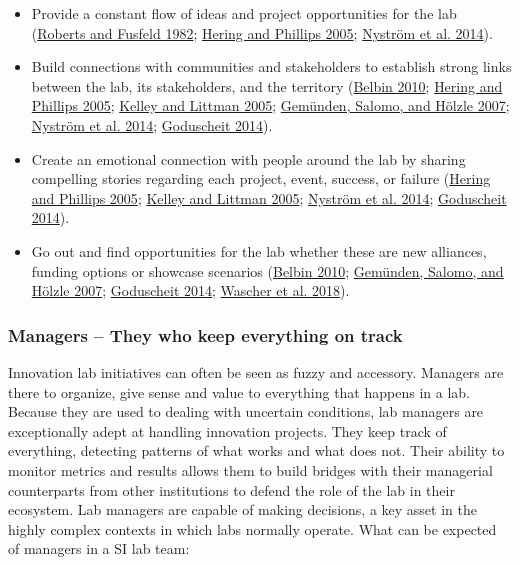 \documentclass[AMA,STIX1COL,APA,STIX2COL]{WileyNJD-v2}
\providecommand{\tightlist}{%
  \setlength{\itemsep}{0pt}\setlength{\parskip}{0pt}}
\begin{document}
\begin{itemize}
\tightlist
\item
  Provide a constant flow of ideas and project opportunities for the lab
  (\protect\hyperlink{ref-Roberts1982}{Roberts and Fusfeld 1982};
  \protect\hyperlink{ref-Hering2005}{Hering and Phillips 2005};
  \protect\hyperlink{ref-Nystrom2014}{Nyström et al. 2014}).
\item
  Build connections with communities and stakeholders to establish
  strong links between the lab, its stakeholders, and the territory
  (\protect\hyperlink{ref-Belbin2010}{Belbin 2010};
  \protect\hyperlink{ref-Hering2005}{Hering and Phillips 2005};
  \protect\hyperlink{ref-Kelley2005}{Kelley and Littman 2005};
  \protect\hyperlink{ref-Gemunden2007}{Gemünden, Salomo, and Hölzle
  2007}; \protect\hyperlink{ref-Nystrom2014}{Nyström et al. 2014};
  \protect\hyperlink{ref-Goduscheit2014}{Goduscheit 2014}).
\item
  Create an emotional connection with people around the lab by sharing
  compelling stories regarding each project, event, success, or failure
  (\protect\hyperlink{ref-Hering2005}{Hering and Phillips 2005};
  \protect\hyperlink{ref-Kelley2005}{Kelley and Littman 2005};
  \protect\hyperlink{ref-Nystrom2014}{Nyström et al. 2014};
  \protect\hyperlink{ref-Goduscheit2014}{Goduscheit 2014}).
\item
  Go out and find opportunities for the lab whether these are new
  alliances, funding options or showcase scenarios
  (\protect\hyperlink{ref-Belbin2010}{Belbin 2010};
  \protect\hyperlink{ref-Gemunden2007}{Gemünden, Salomo, and Hölzle
  2007}; \protect\hyperlink{ref-Goduscheit2014}{Goduscheit 2014};
  \protect\hyperlink{ref-Wascher2018}{Wascher et al. 2018}).
\end{itemize}

\hypertarget{managers-they-who-keep-everything-on-track}{%
\subsubsection{Managers -- They who keep everything on
track}\label{managers-they-who-keep-everything-on-track}}

Innovation lab initiatives can often be seen as fuzzy and accessory.
Managers are there to organize, give sense and value to everything that
happens in a lab. Because they are used to dealing with uncertain
conditions, lab managers are exceptionally adept at handling innovation
projects. They keep track of everything, detecting patterns of what
works and what does not. Their ability to monitor metrics and results
allows them to build bridges with their managerial counterparts from
other institutions to defend the role of the lab in their ecosystem. Lab
managers are capable of making decisions, a key asset in the highly
complex contexts in which labs normally operate. What can be expected of
managers in a SI lab team:
\end{document}
